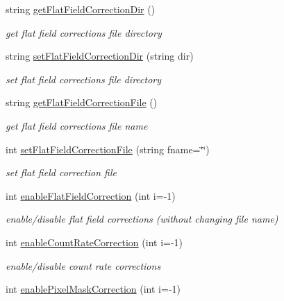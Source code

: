 \begin{CompactItemize}
string \hyperlink{classslsDetectorUsers_0b20511a94205abd689f31bd1a2d4c18}{get\-Flat\-Field\-Correction\-Dir} ()
\begin{CompactList}\small\item\em get flat field corrections file directory \item\end{CompactList}\item 
string \hyperlink{classslsDetectorUsers_65b112dac3d8b94f219f4d64c13cf0f9}{set\-Flat\-Field\-Correction\-Dir} (string dir)
\begin{CompactList}\small\item\em set flat field corrections file directory \item\end{CompactList}\item 
string \hyperlink{classslsDetectorUsers_a83083f73523557e6129f33b59f38327}{get\-Flat\-Field\-Correction\-File} ()
\begin{CompactList}\small\item\em get flat field corrections file name \item\end{CompactList}\item 
int \hyperlink{classslsDetectorUsers_ad9e6da8683ba2887174505fd3b7d739}{set\-Flat\-Field\-Correction\-File} (string fname=\char`\"{}\char`\"{})
\begin{CompactList}\small\item\em set flat field correction file \item\end{CompactList}\item 
int \hyperlink{classslsDetectorUsers_94c74499f7653116cd8aff9ec0d14c43}{enable\-Flat\-Field\-Correction} (int i=-1)
\begin{CompactList}\small\item\em enable/disable flat field corrections (without changing file name) \item\end{CompactList}\item 
int \hyperlink{classslsDetectorUsers_82efe2f57758d63d330d78b121f8e77e}{enable\-Count\-Rate\-Correction} (int i=-1)
\begin{CompactList}\small\item\em enable/disable count rate corrections \item\end{CompactList}\item 
int \hyperlink{classslsDetectorUsers_e5bc1c9c8e7e6cb7c9cde06a3133d263}{enable\-Pixel\-Mask\-Correction} (int i=-1)

\end{CompactItemize}
